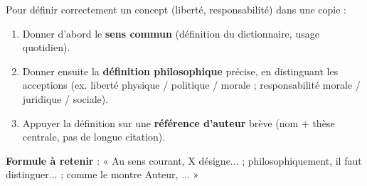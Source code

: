 \documentclass[11pt]{article}
\begin{document}
\begin{methode}
Pour définir correctement un concept (liberté, responsabilité) dans une copie :
\begin{enumerate}
\item Donner d'abord le \textbf{sens commun} (définition du dictionnaire, usage quotidien).
\item Donner ensuite la \textbf{définition philosophique} précise, en distinguant les acceptions (ex. liberté physique / politique / morale ; responsabilité morale / juridique / sociale).
\item Appuyer la définition sur une \textbf{référence d'auteur} brève (nom + thèse centrale, pas de longue citation).
\end{enumerate}
\textbf{Formule à retenir} : « Au sens courant, X désigne... ; philosophiquement, il faut distinguer... ; comme le montre Auteur, ... »
\end{methode}
\end{document}
